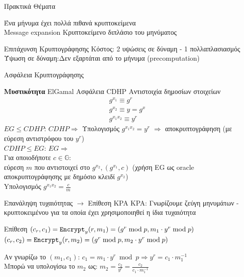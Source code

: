 \documentclass[handout]{beamer}
\begin{document}
\begin{frame}{Πρακτικά Θέματα}

 Ένα μήνυμα έχει πολλά πιθανά κρυπτοκείμενα \\
\pause
\alert{Message expansion} Κρυπτοκείμενο διπλάσιο του μηνύματος \\
\pause
\begin{block}{Επιτάχυνση Κρυπτογράφησης}
Κόστος: 2 υψώσεις σε δύναμη - 1 πολλαπλασιασμός\\
Ύψωση σε δύναμη:Δεν εξαρτάται από το μήνυμα (precomputation)
\end{block}

\end{frame}

\begin{frame}{Ασφάλεια Κρυπτογράφησης}
\begin{block}{\textbf{Μυστικότητα} ElGamal \equiv Ασφάλεια CDHP}
Αντιστοιχία δημοσίων στοιχείων
\begin{align*}
g^{x_1} \equiv g^r  \\
g^{x_2} \equiv y=g^x \\
g^{x_1x_2} \equiv y^r
\end{align*}
\pause
$EG \leq CDHP$: $CDHP \Rightarrow$ \pause Υπολογισμός $g^{x_1x_2} = y^r$ \pause $\Rightarrow$ αποκρυπτογράφηση (με εύρεση αντιστρόφου του $y^r$)\\
\pause
$CDHP \leq EG$: $EG \Rightarrow$ \pause\\
 Για οποιοδήποτε $c \in \mathbb{G}$: \\ \pause 
 εύρεση $m$ που αντιστοιχεί στο $g^{x_2},(g^{x_1},c)$ (χρήση EG ως oracle αποκρυπτογράφησης με δημόσιο κλειδί $g^{x_2}$) \\ \pause 
 Yπολογισμός $g^{x_1x_2} = \frac{c}{m}$ 
\end{block}

\end{frame}

\begin{frame}{Επανάληψη τυχαιότητας $\rightarrow$ Επίθεση KPA}
KPA: Γνωρίζουμε  ζεύγη μηνυμάτων - κρυπτοκειμένου για τα οποία έχει χρησιμοποιηθεί η ίδια τυχαιότητα
\pause
\begin{block}{Επίθεση}
$(c_r,c_1) = \mathtt{Encrypt}_y(r,m_1) = (g^r \bmod p, m_1 \cdot y^r \bmod p)$
$(c_r,c_2) = \mathtt{Encrypt}_y(r,m_2) = (g^r \bmod p, m_2 \cdot y^r \bmod p)$
\end{block}
\pause
Αν γνωρίζω το $(m_1,c_1)$:
$c_1 = m_1 \cdot y^r \bmod p \Rightarrow y^r = c_1 \cdot m_1^{-1}$\\
\medskip
\pause
Μπορώ να υπολογίσω το $m_2$ ως:
$m_2 = \frac{c_2}{y^r} = \frac{c_2}{c_1 \cdot m_1^{-1}}$
\end{frame}
\end{document}
